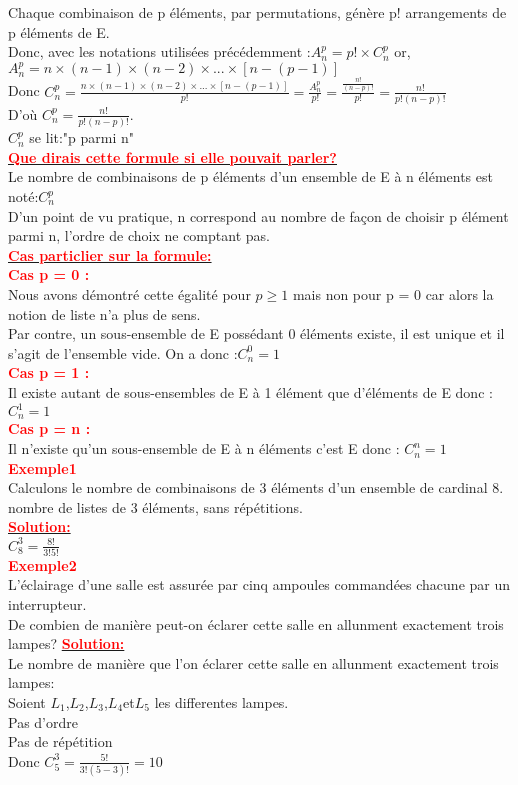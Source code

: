 \documentclass[12pt]{article}
\begin{document}
Chaque combinaison de p éléments, par permutations, génère p! arrangements
de p éléments de E.\\
Donc, avec les notations utilisées précédemment :$ A^{p}_{n}=p! \times C^{p}_{n}$ or, 
$A_{n}^{p}=n\times(n-1)\times(n-2)\times...\times[n-(p-1)]$\\
Donc $C^{p}_{n}=\frac{n\times(n-1)\times(n-2)\times...\times[n-(p-1)]}{p!}=\frac{A^{p}_{n}}{p!}
=\frac{\frac{n!}{(n-p)!}}{p!}=\frac{n!}{p!(n-p)!}$\\
D'où $C^{p}_{n}=\frac{n!}{p!(n-p)!}$.\\ $C^{p}_{n}$ se lit:"p parmi n" \\
\underline{\textbf{\textcolor{red}{Que dirais cette formule si elle pouvait parler?}}}\\
Le nombre de combinaisons de p éléments d'un ensemble de E à n éléments est noté:$C^{p}_{n}$\\
D'un point de vu pratique, n correspond au nombre de façon de choisir p élément parmi n, l'ordre de choix ne comptant pas.\\
\underline{\textbf{\textcolor{red}{Cas particlier sur la formule:}}}\\
\textbf{\textcolor{red}{Cas p = 0 :}} \\
Nous avons démontré cette égalité pour $p \geq 1$ mais non pour p = 0 car alors la notion de liste n’a plus de sens.\\
Par contre, un sous-ensemble de E possédant 0 éléments existe, il est unique et il s’agit de l’ensemble vide.
On a donc :$C^{0}_{n}=1$ \\
\textbf{\textcolor{red}{Cas p = 1 :}} \\
Il existe autant de sous-ensembles de E à 1 élément que d’éléments de E donc :$C^{1}_{n}=1$\\
\textbf{\textcolor{red}{Cas p = n :}} \\
Il n’existe qu’un sous-ensemble de E à n éléments c’est E donc : $C^{n}_{n}=1$\\
\textbf{\textcolor{red}{Exemple1}} \\
Calculons le nombre de combinaisons de 3 éléments d’un ensemble de cardinal 8.\\
nombre de listes de 3 éléments, sans répétitions. \\
\underline{\textbf{\textcolor{red}{Solution:}}}\\
$C^{3}_{8}=\frac{8!}{3!5!}$\\
\textbf{\textcolor{red}{Exemple2}} \\
L'éclairage d'une salle est assurée par cinq ampoules commandées chacune par un interrupteur.\\
De combien de manière peut-on éclarer cette salle en allunment exactement trois lampes?
\underline{\textbf{\textcolor{red}{Solution:}}}\\
Le nombre de manière que l'on éclarer cette salle en allunment exactement trois lampes:\\
Soient $L_{1}$,$L_{2}$,$L_{3}$,$L_{4}$et$L_{5}$ les differentes lampes.\\
Pas d'ordre\\
Pas de répétition\\
Donc $C^{3}_{5}=\frac{5!}{3!(5-3)!}=10$
\end{document}
